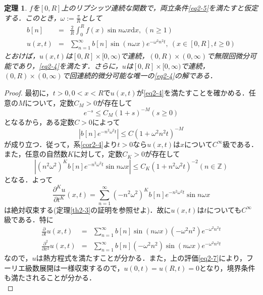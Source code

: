 \documentclass[a4j]{jsbook}
\newtheorem{theorem}{定理}
\numberwithin{theorem}{chapter}  %
\begin{document}
\begin{theorem}
\label{th2-6}
\(f\)を\([0, R]\)上のリプシッツ連続な関数で，両立条件\eqref{eq2-5}を満たすと仮定する．このとき，\(\displaystyle\omega:=\frac{\pi}{R}\)として
\begin{eqnarray*}
b[n]&=&\frac{2}{R}\int_0^R f(x)\sin n\omega x\mathrm{d}x,\ (n\geq 1) \\
u(x, t)&=&\sum_{n=1}^\infty b[n]\sin(n\omega x)e^{-\omega^2 n^2t},\ (x\in[0, R], t\geq 0)
\end{eqnarray*}
とおけば，\(u(x, t)\)は\([0, R]\times[0, \infty)\)で連続，\((0, R)\times(0, \infty)\)で無限回微分可能であり，\eqref{eq2-4}を満たす．さらに，\(u\)は\([0, R]\times[0, \infty)\)で連続，\((0, R)\times(0, \infty)\)で回連続的微分可能な唯一の\eqref{eq2-4}の解である．
\end{theorem}
\begin{proof}
最初に，\(t>0, 0<x<R\)で\(u(x, t)\)が\eqref{eq2-4}を満たすことを確かめる．任意の\(M\)について，定数\(C_M>0\)が存在して
\begin{equation*}
    e^{-s}\leq C_M(1+s)^{-M} (s\geq 0)
\end{equation*}
となるから，ある定数\(C>0\)によって
\begin{equation}
    \left|b[n]e^{-n^2\omega^2 t}\right|\leq C(1+\omega^2 n^2t)^{-M} \label{eq2-7}
\end{equation}
が成り立つ．従って，系\ref{cor2-4}より\(t>0\)なら\(u(x, t)\)は\(x\)について\(C^\infty\)級である．また，任意の自然数\(K\)に対して，定数\(C_K>0\)が存在して
\begin{equation*}
    \left|(n^2\omega^2)^K b[n]e^{-n^2\omega^2 t}\sin n\omega x\right|\leq C_K(1+n^2\omega^2 t)^{-2} (n\in\mathbb{Z})
\end{equation*}
となる．よって
\begin{equation*}
    \frac{\partial^K u}{\partial t^K}(x, t)=\sum_{n=1}^\infty　(-n^2\omega^2)^K b[n]e^{-n^2\omega^2 t}\sin n\omega x
\end{equation*}
は絶対収束する(定理\ref{th2-3}の証明を参照せよ)．故に\(u(x, t)\)は\(t\)についても\(C^\infty\)級である．特に
\begin{eqnarray*}
\frac{\partial}{\partial t}u(x, t)&=&\sum_{n=1}^\infty b[n]\sin(n\omega x)(-\omega^2 n^2)e^{-\omega^2 n^2t} \\
\frac{\partial^2}{\partial x^2}u(x, t)&=&\sum_{n=1}^\infty b[n](-\omega^2 n^2)\sin(n\omega x)e^{-\omega^2 n^2t}
\end{eqnarray*}
なので，\(u\)は熱方程式を満たすことが分かる．また，上の評価\eqref{eq2-7}により，フーリエ級数展開は一様収束するので，\(u(0, t)=u(R, t)=0\)となり，境界条件も満たされることが分かる．\\

\end{proof}
\end{document}
